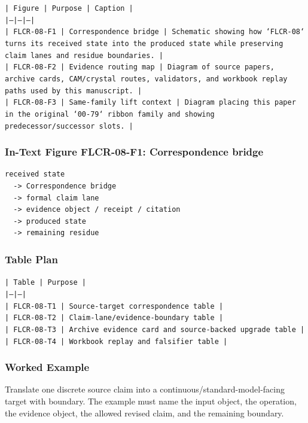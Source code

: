 \documentclass[11pt]{article}
\begin{document}
\noindent\texttt{| Figure | Purpose | Caption |}\\
\noindent\texttt{|---|---|---|}\\
\noindent\texttt{| FLCR-08-F1 | Correspondence bridge | Schematic showing how `FLCR-08` turns its received state into the produced state while preserving claim lanes and residue boundaries. |}\\
\noindent\texttt{| FLCR-08-F2 | Evidence routing map | Diagram of source papers, archive cards, CAM/crystal routes, validators, and workbook replay paths used by this manuscript. |}\\
\noindent\texttt{| FLCR-08-F3 | Same-family lift context | Diagram placing this paper in the original `00-79` ribbon family and showing predecessor/successor slots. |}\\

\subsubsection*{In-Text Figure FLCR-08-F1: Correspondence bridge}

\begin{verbatim}
received state
  -> Correspondence bridge
  -> formal claim lane
  -> evidence object / receipt / citation
  -> produced state
  -> remaining residue
\end{verbatim}

\subsubsection*{Table Plan}

\noindent\texttt{| Table | Purpose |}\\
\noindent\texttt{|---|---|}\\
\noindent\texttt{| FLCR-08-T1 | Source-target correspondence table |}\\
\noindent\texttt{| FLCR-08-T2 | Claim-lane/evidence-boundary table |}\\
\noindent\texttt{| FLCR-08-T3 | Archive evidence card and source-backed upgrade table |}\\
\noindent\texttt{| FLCR-08-T4 | Workbook replay and falsifier table |}\\

\subsubsection*{Worked Example}

Translate one discrete source claim into a continuous/standard-model-facing target with boundary. The example must name the input object, the operation,
the evidence object, the allowed revised claim, and the remaining boundary.
\end{document}
